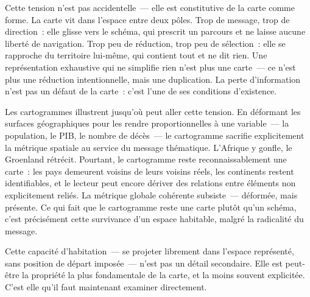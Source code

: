 Cette tension n'est pas accidentelle~--- elle est constitutive de la carte comme forme. La carte vit dans l'espace entre deux pôles. Trop de message, trop de direction~: elle glisse vers le schéma, qui prescrit un parcours et ne laisse aucune liberté de navigation. Trop peu de réduction, trop peu de sélection~: elle se rapproche du territoire lui-même, qui contient tout et ne dit rien. Une représentation exhaustive qui ne simplifie rien n'est plus une carte~--- ce n'est plus une réduction intentionnelle, mais une duplication. La perte d'information n'est pas un défaut de la carte~: c'est l'une de ses conditions d'existence.

Les cartogrammes illustrent jusqu'où peut aller cette tension. En déformant les surfaces géographiques pour les rendre proportionnelles à une variable~--- la population, le PIB, le nombre de décès~--- le cartogramme sacrifie explicitement la métrique spatiale au service du message thématique. L'Afrique y gonfle, le Groenland rétrécit. Pourtant, le cartogramme reste reconnaissablement une carte~: les pays demeurent voisins de leurs voisins réels, les continents restent identifiables, et le lecteur peut encore dériver des relations entre éléments non explicitement reliés. La métrique globale cohérente subsiste~--- déformée, mais présente. Ce qui fait que le cartogramme reste une carte plutôt qu'un schéma, c'est précisément cette survivance d'un espace habitable, malgré la radicalité du message.

Cette capacité d'habitation~--- se projeter librement dans l'espace représenté, sans position de départ imposée~--- n'est pas un détail secondaire. Elle est peut-être la propriété la plus fondamentale de la carte, et la moins souvent explicitée. C'est elle qu'il faut maintenant examiner directement.